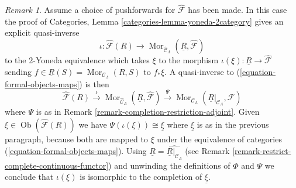 \documentclass{stacks-project}
\theoremstyle{plain}
\theoremstyle{definition}
\theoremstyle{remark}
\newtheorem{remark}[subsection]{Remark}
\numberwithin{equation}{subsection}
\def\Mor{\mathop{\mathrm{Mor}}\nolimits}
\def\Ob{\mathop{\mathrm{Ob}}\nolimits}
\begin{document}
\begin{remark}
\medskip\noindent
Assume a choice of pushforwards for $\widehat{\mathcal{F}}$ has been made.
In this case the proof of
Categories, Lemma \ref{categories-lemma-yoneda-2category}
gives an explicit quasi-inverse
$$
\iota :
\widehat{\mathcal{F}}(R) \longrightarrow
\Mor_{\widehat{\mathcal{C}}_\Lambda}(
\underline{R}, \widehat{\mathcal{F}})
$$
to the 2-Yoneda equivalence which takes $\xi$ to the morphism
$\iota(\xi) : \underline{R} \to \widehat{\mathcal{F}}$ sending
$f \in \underline{R}(S) = \Mor_{\mathcal{C}_\Lambda}(R, S)$
to $f_*\xi$. A quasi-inverse to (\ref{equation-formal-objects-maps})
is then
$$
\widehat{\mathcal{F}}(R)
\xrightarrow{\iota}
\Mor_{\widehat{\mathcal{C}}_\Lambda}(
\underline{R}, \widehat{\mathcal{F}})
\xrightarrow{\Psi}
\Mor_{\mathcal{C}_\Lambda}(
\underline{R}|_{\mathcal{C}_\Lambda}, \mathcal{F})
$$
where $\Psi$ is as in
Remark \ref{remark-completion-restriction-adjoint}.
Given $\xi \in \Ob(\widehat{\mathcal{F}}(R))$ we have
$\Psi(\iota(\xi)) \cong \underline{\xi}$ where $\underline{\xi}$
is as in the previous paragraph, because both are mapped to $\xi$
under the equivalence of categories (\ref{equation-formal-objects-maps}).
Using $\underline{R} = \widehat{\underline{R}|_{\mathcal{C}_\Lambda}}$
(see Remark \ref{remark-restrict-complete-continuous-functor})
and unwinding the definitions of $\Phi$ and $\Psi$ we conclude that
$\iota(\xi)$ is isomorphic to the completion of $\underline{\xi}$.
\end{remark}
\end{document}
